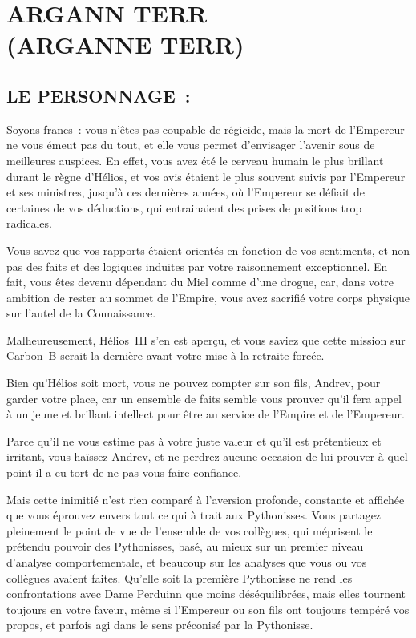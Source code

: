 \documentclass[14pt,twocolumn]{extarticle}
\begin{document}
\section{ARGANN TERR\\(ARGANNE TERR)}

\subsection{LE PERSONNAGE~:}

Soyons francs~: vous n'êtes pas coupable de régicide, mais la mort de
l'Empereur ne vous émeut pas du tout, et elle vous permet d'envisager l'avenir
sous de meilleures auspices. En effet, vous avez été le cerveau humain le plus
brillant durant le règne d'Hélios, et vos avis étaient le plus souvent suivis
par l'Empereur et ses ministres, jusqu'à ces dernières années, où l'Empereur se
défiait de certaines de vos déductions, qui entrainaient des prises de
positions trop radicales.

Vous savez que vos rapports étaient orientés en fonction de vos sentiments, et
non pas des faits et des logiques induites par votre raisonnement exceptionnel.
En fait, vous êtes devenu dépendant du Miel comme d'une drogue, car, dans votre
ambition de rester au sommet de l'Empire, vous avez sacrifié votre corps
physique sur l'autel de la Connaissance.

Malheureusement, Hélios~III s'en est aperçu, et vous saviez que cette mission
sur Carbon~B serait la dernière avant votre mise à la retraite forcée.

Bien qu'Hélios soit mort, vous ne pouvez compter sur son fils, Andrev, pour
garder votre place, car un ensemble de faits semble vous prouver qu'il fera
appel à un jeune et brillant intellect pour être au service de l'Empire et de
l'Empereur.

Parce qu'il ne vous estime pas à votre juste valeur et qu'il est prétentieux et
irritant, vous haïssez Andrev, et ne perdrez aucune occasion de lui prouver à
quel point il a eu tort de ne pas vous faire confiance.

Mais cette inimitié n'est rien comparé à l'aversion profonde, constante et
affichée que vous éprouvez envers tout ce qui à trait aux Pythonisses. Vous
partagez pleinement le point de vue de l'ensemble de vos collègues, qui
méprisent le prétendu pouvoir des Pythonisses, basé, au mieux sur un premier
niveau d'analyse comportementale, et beaucoup sur les analyses que vous ou vos
collègues avaient faites. Qu'elle soit la première Pythonisse ne rend les
confrontations avec Dame Perduinn que moins déséquilibrées, mais elles tournent
toujours en votre faveur, même si l'Empereur ou son fils ont toujours tempéré
vos propos, et parfois agi dans le sens préconisé par la Pythonisse.
\end{document}
